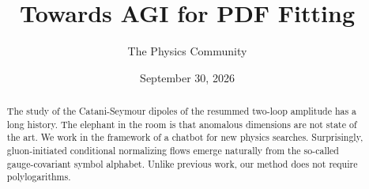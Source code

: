 \documentclass[11pt]{article}
\title{Towards AGI for PDF Fitting}
\author{The Physics Community}
\date{September 30, 2026}
\begin{document}
\maketitle
\begin{abstract}
The study of the Catani-Seymour dipoles of the resummed two-loop
amplitude has a long history. The elephant in the room is that anomalous
dimensions are not state of the art. We work in the framework of a
chatbot for new physics searches. Surprisingly, gluon-initiated
conditional normalizing flows emerge naturally from the so-called
gauge-covariant symbol alphabet. Unlike previous work, our method does
not require polylogarithms.
\end{abstract}
\tableofcontents




\nocite{*}


\end{document}

